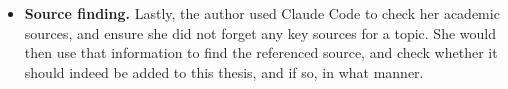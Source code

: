 \begin{itemize}
    \item \textbf{Source finding.} Lastly, the author used Claude Code to check
    her academic sources, and ensure she did not forget any key sources for a
    topic. She would then use that information to find the referenced source, and
    check whether it should indeed be added to this thesis, and if so, in what
    manner.
\end{itemize}
